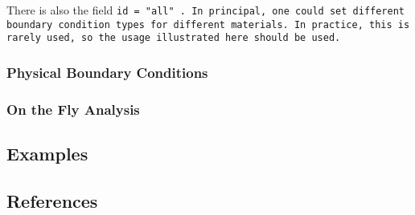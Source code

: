 There is also the field \tt id = "all" \normalfont.  In principal, one could
set different boundary condition types for different materials.  In practice,
this is rarely used, so the usage illustrated here should be used.

\subsubsection{Physical Boundary Conditions} \label{PhysicalBCs}
\subsubsection{On the Fly Analysis} \label{OTFA_MPM}

\subsection{Examples} \label{Sec:ExamplesMPM}

\subsection{References}









